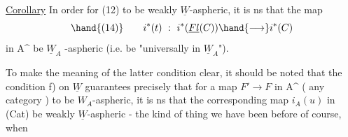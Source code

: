 \uline{Corollary} In order for (12) to be weakly $\underline{W}$-aspheric, it is ns that
the map
\[ \hand{(14)} \qquad i^{*}(t)\ :\ i^{*}(\underline{Fl}(C))\hand{\longrightarrow} i^{*}(C) \]
in A\^{} be $\underline{W}_A$ -aspheric (i.e. be "universally in $\underline{W}_A$").

To make the meaning of the latter condition clear, it should be
noted that the condition f) on $\underline{W}$ guarantees precisely that for a
map $F'\to F$ in A\^{} ( any category  ) to be  $W_A$-aspheric, it is
ns that the corresponding map $i_A(u)$ in (Cat) be weakly $\underline{W}$-aspheric -
the kind of thing we have been  before of course, when

